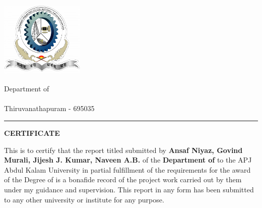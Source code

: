 \thispagestyle{plain}
\noindent
\begin{minipage}{0.30\textwidth}
\includegraphics[width=40mm]{logo.png}
\end{minipage}
\begin{minipage}{0.70\textwidth}

 Department of \Department \\
 \University \\
 Thiruvanathapuram - 695035
\end{minipage}

\vspace{0.5\baselineskip}
\hrule
\vspace{2\baselineskip}

\begin{center}
{\Large {\bf \uppercase{Certificate}}}
\end{center}

\vspace{\baselineskip}

\noindent 

This is to certify that the report titled {\bf \ReportTitle}submitted by {\bf Ansaf Niyaz, Govind Murali, Jijesh J. Kumar, Naveen A.B.} of the {\bf Department of \Department} to the APJ Abdul Kalam
University in partial fulfillment of the requirements for the award of the Degree of \emph{\Degree} is a bonafide record of the project work
carried out by them under my guidance and supervision. This report in any form has been
submitted
to
any
other
university
or
institute
for
any
purpose.

\vspace{4\baselineskip}

